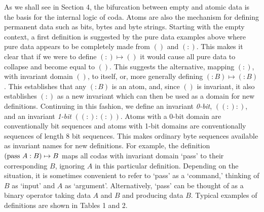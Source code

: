 \documentclass[11pt]{article}
\begin{document}
    As we shall see in Section 4, the bifurcation between empty and atomic data is the basis for the internal logic of coda.  
Atoms are also the mechanism for defining permanent data such as bits, bytes and byte strings.   
Starting with the empty context, a first definition is suggested by the pure data examples above where pure data 
appears to be completely made from $()$ and $(:)$.  
This makes it clear that if we were to define $(:)\mapsto()$ it would cause all pure data to collapse and become equal to $()$.  
This suggests the alternative, mapping $(:)$, with invariant domain $()$, to itself, or, more generally defining $(:B)\mapsto(:B)$.  
This establishes that any $(:B)$ is an atom, and, since $()$ is invariant, it also establishes $(:)$ as a new invariant which can then be 
used as a domain for new definitions.  Continuing in this fashion, we define an invariant {\it 0-bit}, $((:):)$, and an invariant {\it 1-bit} $((:):(:))$.  
Atoms with a 0-bit domain are conventionally bit sequences and atoms with 1-bit domains are conventionally sequences of length 8 bit sequences.  
This makes ordinary byte sequences available as invariant names for new definitions.  For example, the definition $({\rm pass}\ A:B)\mapsto B$ 
maps all codas with invariant domain `pass' to their corresponding $B$, ignoring $A$ in this particular definition.  Depending on the situation, 
it is sometimes convenient to refer to `pass' as a `command,' thinking of $B$ as 
`input' and $A$ as `argument'.  Alternatively, `pass' can be thought of as a binary operator taking data $A$ and $B$ and producing data $B$. 
Typical examples of definitions are shown in Tables 1 and 2.  
\end{document}
